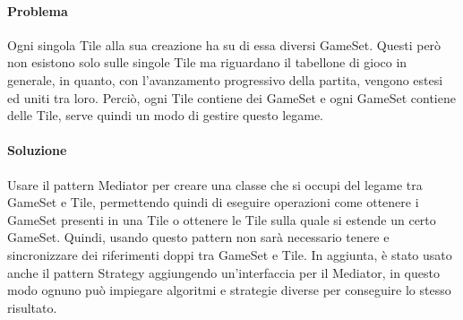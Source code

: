 \paragraph{Problema}
Ogni singola Tile alla sua creazione ha su di essa diversi GameSet. Questi però non esistono solo sulle singole Tile ma riguardano il tabellone di gioco in generale, in quanto, con l'avanzamento progressivo della partita, vengono estesi ed uniti tra loro. Perciò, ogni Tile contiene dei GameSet e ogni GameSet contiene delle Tile, serve quindi un modo di gestire questo legame.
\paragraph{Soluzione}
Usare il pattern Mediator per creare una classe che si occupi del legame tra GameSet e Tile, permettendo quindi di eseguire operazioni come ottenere i GameSet presenti in una Tile o ottenere le Tile sulla quale si estende un certo GameSet. Quindi, usando questo pattern non sarà necessario tenere e sincronizzare dei riferimenti doppi tra GameSet e Tile. In aggiunta, è stato usato anche il pattern Strategy aggiungendo un'interfaccia per il Mediator, in questo modo ognuno può impiegare algoritmi e strategie diverse per conseguire lo stesso risultato.
\clearpage


